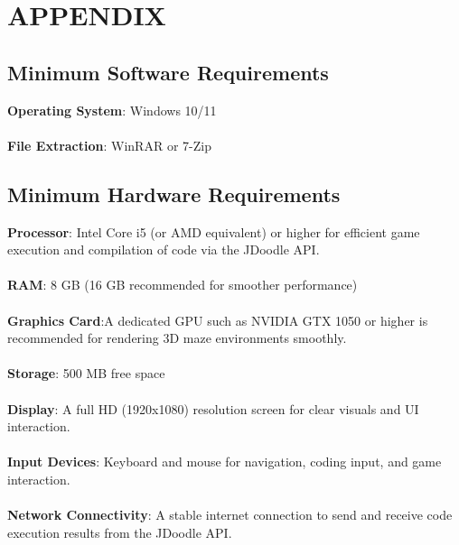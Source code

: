 \chapter{APPENDIX}

\section{Minimum Software Requirements}
\medskip
\textbf{Operating System}: Windows 10/11
\\\\
\textbf{File Extraction}: WinRAR or 7-Zip

\section{Minimum Hardware Requirements}
\textbf{Processor}:  Intel Core i5 (or AMD equivalent) or higher for efficient game execution and compilation of code via the JDoodle API.
\\\\
\textbf{RAM}: 8 GB (16 GB recommended for smoother performance)
\\\\
\textbf{Graphics Card}:A dedicated GPU such as NVIDIA GTX 1050 or higher is recommended for rendering 3D maze environments smoothly.
\\\\
\textbf{Storage}: 500 MB free space
\\\\
\textbf{Display}: A full HD (1920x1080) resolution screen for clear visuals and UI interaction.
\\\\
\textbf{Input Devices}: Keyboard and mouse for navigation, coding input, and game interaction.
\\\\
\textbf{Network Connectivity}: A stable internet connection to send and receive code execution results from the JDoodle API.
\\\\